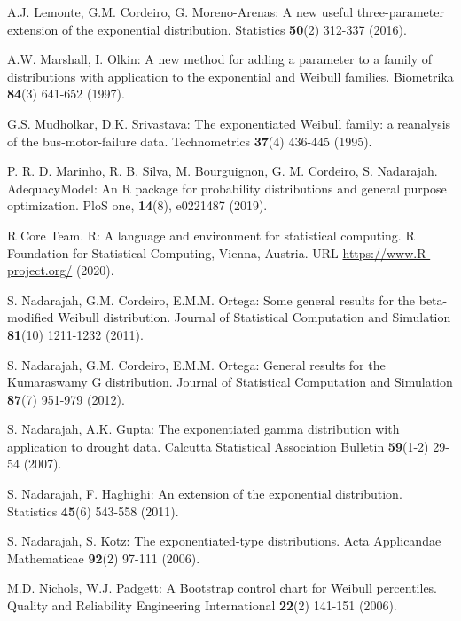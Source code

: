 \documentclass[12pt,a4paper]{article} %
\begin{document}
\begin{description}
\item
A.J. Lemonte, G.M. Cordeiro, G. Moreno-Arenas:
A new useful three-parameter extension of the exponential distribution.
Statistics {\bf 50}(2) 312-337 (2016).

\item
A.W. Marshall, I. Olkin:
A new method for adding a parameter to a family of distributions with
application to the exponential and Weibull families.
Biometrika {\bf 84}(3) 641-652 (1997).

\item
G.S. Mudholkar, D.K. Srivastava:
The exponentiated Weibull family: a reanalysis of the bus-motor-failure data.
Technometrics {\bf 37}(4) 436-445 (1995).

\item 
P. R. D. Marinho,  R. B. Silva,  M. Bourguignon, G. M. Cordeiro,  S. Nadarajah. AdequacyModel: An R package for probability distributions and general purpose optimization. PloS one, {\bf 14}(8), e0221487 (2019).

\item
R Core Team. R: A language and environment for statistical computing. R Foundation for Statistical Computing, Vienna, Austria. URL
\url{https://www.R-project.org/} (2020).

\item
S. Nadarajah, G.M. Cordeiro, E.M.M. Ortega:
Some general results for the beta-modified Weibull distribution.
Journal of Statistical Computation and Simulation {\bf 81}(10) 1211-1232 (2011).

\item
S. Nadarajah, G.M. Cordeiro, E.M.M. Ortega:
General results for the Kumaraswamy G distribution.
Journal of Statistical Computation and Simulation {\bf 87}(7) 951-979 (2012).

\item
S. Nadarajah, A.K. Gupta:
The exponentiated gamma distribution with application to drought data.
Calcutta Statistical Association Bulletin {\bf 59}(1-2) 29-54 (2007).

\item
S. Nadarajah, F. Haghighi:
An extension of the exponential distribution.
Statistics {\bf 45}(6) 543-558 (2011).

\item
S. Nadarajah, S. Kotz:
The exponentiated-type distributions.
Acta Applicandae Mathematicae {\bf 92}(2) 97-111 (2006).

\item
M.D. Nichols, W.J. Padgett:
A Bootstrap control chart for Weibull percentiles.
Quality and Reliability Engineering International {\bf 22}(2) 141-151 (2006).


\end{description}
\end{document}
